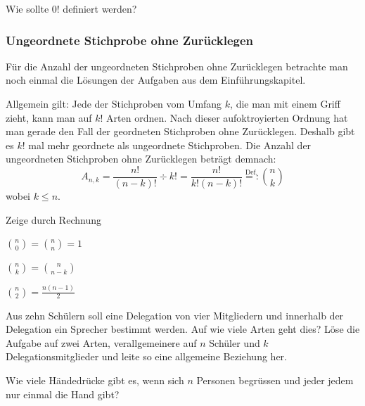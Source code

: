 \documentclass[%
11pt,%
twoside,%
titlepage,%
german,%
headsepline%
]{scrartcl}
\begin{document}
\begin{ueb}[Sonderfall]
Wie sollte $0!$ definiert werden?
\end{ueb}

\subsubsection{Ungeordnete Stichprobe ohne Zurücklegen}
Für die Anzahl der ungeordneten Stichproben ohne Zurücklegen betrachte man noch einmal die Lösungen der Aufgaben aus dem Einführungskapitel.

Allgemein gilt: Jede der Stichproben vom Umfang $k$, die man mit einem Griff zieht, kann man auf $k!$ Arten ordnen. Nach dieser aufoktroyierten Ordnung hat man gerade den Fall der geordneten Stichproben ohne Zurücklegen. Deshalb gibt es $k!$ mal mehr geordnete als ungeordnete Stichproben.
Die Anzahl der ungeordneten Stichproben ohne Zurücklegen beträgt demnach:
$$A_{n,k}=\frac{n!}{(n-k)!}\div k!=\frac{n!}{k!(n-k)!}\stackrel{\text{Def.}}{=:}\binom{n}{k}$$
wobei $k\leq n$.

\begin{ueb}[Binomialkoeffizienten]

Zeige durch Rechnung
\begin{enumeratea}
\item $\binom{n}{0}=\binom{n}{n}=1$
\item $\binom{n}{k}=\binom{n}{n-k}$
\item $\binom{n}{2}=\frac{n(n-1)}{2}$
\end{enumeratea}
\end{ueb}

\begin{ueb}[Delegation]
Aus zehn Schülern soll eine Delegation von vier Mitgliedern und innerhalb der Delegation ein Sprecher bestimmt werden. Auf wie viele Arten geht dies? Löse die Aufgabe auf zwei Arten, verallgemeinere auf $n$ Schüler und $k$ Delegationsmitglieder und leite so eine allgemeine Beziehung her.
\end{ueb}

\begin{ueb}
Wie viele Händedrücke gibt es, wenn sich $n$ Personen begrüssen und jeder jedem nur einmal die Hand gibt?
\end{ueb}
\end{document}
